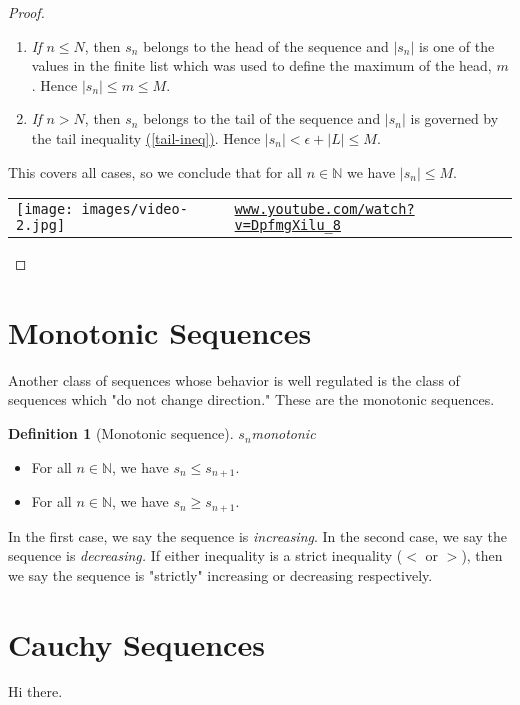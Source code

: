 \documentclass[10pt,]{article}
\theoremstyle{plain}
\theoremstyle{definition}
\newtheorem{definition}[theorem]{Definition}
\numberwithin{equation}{section}
\newcommand{\lt}{<}
\newcommand{\gt}{>}
\begin{document}
\begin{proof}
\begin{enumerate}
\item\hypertarget{li-1}{}\emph{If \(n \leq N\)}, then \(s_n\) belongs to the head of the sequence and \(|s_n|\) is one of the values in the finite list which was used to define the maximum of the head, \(m\). Hence \(|s_n|\leq m \leq M.\)%
\item\hypertarget{li-2}{}\emph{If \(n \gt N\)}, then \(s_n\) belongs to the tail of the sequence and \(|s_n|\) is governed by the tail inequality \hyperref[tail-ineq]{(\ref{tail-ineq})}. Hence \(|s_n| \lt \epsilon+|L| \leq M.\)%
\end{enumerate}
\hypertarget{p-13}{}%
This covers all cases, so we conclude that for all \(n\in\mathbb{N}\) we have \(|s_n|\leq M.\)%
\begin{tabular}{m{.2\linewidth}m{.6\linewidth}}
\texttt{[image: images/video-2.jpg]}&%
\href{https://www.youtube.com/watch?v=DpfmgXilu_8}{\texttt{\nolinkurl{www.youtube.com/watch?v=DpfmgXilu_8}}}
\end{tabular}
\end{proof}
\typeout{************************************************}
\typeout{************************************************}
\section[{Monotonic Sequences}]{Monotonic Sequences}\label{section-monotonic}
\hypertarget{p-14}{}%
Another class of sequences whose behavior is well regulated is the class of sequences which "do not change direction." These are the monotonic sequences.%
\begin{definition}[{Monotonic sequence}]\label{definition-2}
\(s_n\)\emph{monotonic}\leavevmode%
\begin{itemize}[label=\textbullet]
\item{}For all \(n\in\mathbb{N}\), we have \(s_n \leq s_{n+1}.\)%
\item{}For all \(n\in\mathbb{N}\), we have \(s_n \geq s_{n+1}.\)%
\end{itemize}
In the first case, we say the sequence is \emph{increasing}. In the second case, we say the sequence is \emph{decreasing.} If either inequality is a strict inequality (\(\lt\) or \(\gt\)), then we say the sequence is "strictly" increasing or decreasing respectively.\end{definition}
\hypertarget{p-15}{}%
%
\typeout{************************************************}
\typeout{************************************************}
\section[{Cauchy Sequences}]{Cauchy Sequences}\label{section-cauchy}
\hypertarget{p-16}{}%
Hi there.%
\end{document}
